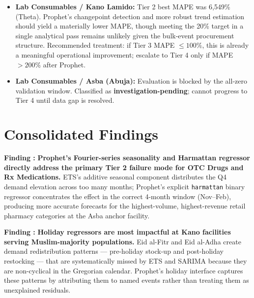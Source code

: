 \documentclass[12pt, a4paper]{article}
\newcounter{finding}
\newcommand{\finding}[1]{%
  \stepcounter{finding}%
  \begin{mdframed}[style=greenbox]
  \textbf{Finding \thefinding:} #1
  \end{mdframed}%
}
\begin{document}
\begin{itemize}[leftmargin=1.5em, itemsep=5pt]
  \item \textbf{Lab Consumables / Kano Lamido:}
        Tier 2 best MAPE was 6,549\% (Theta). Prophet's changepoint
        detection and more robust trend estimation should yield a
        materially lower MAPE, though meeting the 20\% target in a
        single analytical pass remains unlikely given the bulk-event
        procurement structure. Recommended treatment: if Tier 3 MAPE
        $\leq 100\%$, this is already a meaningful operational
        improvement; escalate to Tier 4 only if MAPE $>200\%$ after
        Prophet.

  \item \textbf{Lab Consumables / Asba (Abuja):}
        Evaluation is blocked by the all-zero validation window.
        Classified as \textbf{investigation-pending}; cannot progress to
        Tier 4 until data gap is resolved.
\end{itemize}

\section{Consolidated Findings}

\finding{%
  \textbf{Prophet's Fourier-series seasonality and Harmattan regressor
  directly address the primary Tier 2 failure mode for OTC Drugs and
  Rx Medications.} ETS's additive seasonal component distributes the Q4
  demand elevation across too many months; Prophet's explicit
  \texttt{harmattan} binary regressor concentrates the effect in the
  correct 4-month window (Nov--Feb), producing more accurate forecasts
  for the highest-volume, highest-revenue retail pharmacy categories at
  the Asba anchor facility.
}

\finding{%
  \textbf{Holiday regressors are most impactful at Kano facilities
  serving Muslim-majority populations.} Eid al-Fitr and Eid al-Adha
  create demand redistribution patterns --- pre-holiday stock-up and
  post-holiday restocking --- that are systematically missed by ETS and
  SARIMA because they are non-cyclical in the Gregorian calendar.
  Prophet's holiday interface captures these patterns by attributing
  them to named events rather than treating them as unexplained residuals.
}
\end{document}
